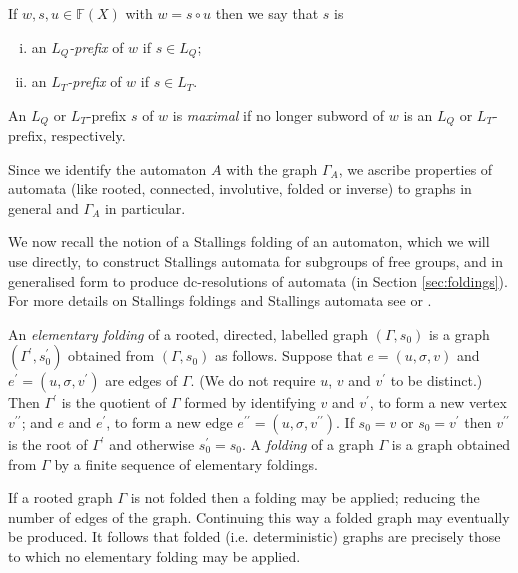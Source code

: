 \documentclass[a4paper,12pt]{article}
\newcommand{\G}{\Gamma }
\newcommand{\s}{\sigma }
\numberwithin{equation}{section}
\numberwithin{figure}{section}
\newcommand{\FF}{\ensuremath{\mathbb{F}}}
\newcommand{\be}{\begin{enumerate}}
\newcommand{\ee}{\end{enumerate}}
\begin{document}
If $w, s, u\in \FF(X)$ with $w=s\circ u$ then we say that $s$ is
\be[(i)]
\item
 an $L_Q${\em -prefix} of $w$ if $s\in L_Q$;
\item
an %
$L_T${\em -prefix} of $w$ if $s\in L_T$.
\ee
An $L_Q$ or $L_T$-prefix $s$ of $w$ is  {\em maximal} if no longer
subword of $w$ is an $L_Q$ or $L_T$-prefix, respectively.

Since we identify the automaton $A$ with the graph $\G_A$, we
ascribe properties of automata (like rooted, connected,
involutive, folded or inverse) to graphs in general and $\G_A$ in
particular.

We now recall the notion of a Stallings folding of an automaton,
which we will use directly, to construct Stallings automata for
subgroups of free groups, and in generalised form to produce
dc-resolutions of automata (in Section \ref{sec:foldings}). For
more details on Stallings foldings  and  Stallings automata  see
\cite{ventura11} or \cite{BartholdiSilva}.

An {\em elementary folding} of a rooted, directed, labelled
graph $(\G,s_0)$ is a
graph $(\G^\prime,s^\prime_0)$ obtained from $(\G,s_0)$ as
follows. Suppose that $e=(u, \s, v)$ and $e^\prime=(u, \s,
v^\prime)$ are edges of $\G$. (We do not require $u$, $v$ and
$v^\prime$ to be distinct.)
 Then $\G^\prime$ is the quotient of $\G$ formed by identifying
$v$ and $v^\prime$, to form a new vertex $v^{\prime\prime}$; and
$e$ and $e^\prime$, to form a new edge $e^{\prime\prime}=(u, \s,
v^{\prime\prime})$. If $s_0= v$ or $s_0 = v^\prime$ then
$v^{\prime\prime}$ is the root of $\G^\prime$ and otherwise
$s^\prime_0=s_0$.
 A {\em folding} of a graph $\G$ is a graph obtained
from $\G$ by a finite sequence of elementary foldings.

If a rooted graph $\G$ is not folded then a folding may be applied; reducing the
number of edges of the graph. Continuing this way a folded graph may eventually
be produced. It follows that  folded (i.e. deterministic) graphs are precisely those
to which no elementary folding may be applied.
\end{document}
